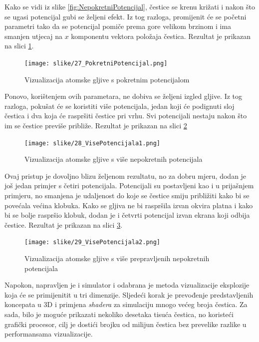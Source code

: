 \documentclass{foi}
\begin{document}
Kako se vidi iz slike \ref{fig:NepokretniPotencijal}, čestice se krenu križati i nakon što se ugasi potencijal gubi se željeni efekt. Iz tog razloga, promijenit će se početni parametri tako da se potencijal pomiče prema gore velikom brzinom i ima smanjen utjecaj na $x$ komponentu vektora položaja čestica. Rezultat je prikazan na slici \ref{fig:PokretniPotencijal}.

\begin{figure}[H]
    \centering
    \texttt{[image: slike/27\_PokretniPotencijal.png]}
    \captionsetup{justification=centering}
    \caption{Vizualizacija atomske gljive s pokretnim potencijalom}
\label{fig:PokretniPotencijal}
\end{figure}

Ponovo, korištenjem ovih parametara, ne dobiva se željeni izgled gljive. Iz tog razloga, pokušat će se koristiti više potencijala, jedan koji će podignuti sloj čestica i dva koja će raspršiti čestice pri vrhu.  Svi potencijali nestaju nakon što im se čestice previše približe. Rezultat je prikazan na slici \ref{fig:VisePotencijala1}

\begin{figure}[H]
    \centering
    \texttt{[image: slike/28\_VisePotencijala1.png]}
    \captionsetup{justification=centering}
    \caption{Vizualizacija atomske gljive s više nepokretnih potencijala}
\label{fig:VisePotencijala1}
\end{figure}

Ovaj pristup je dovoljno blizu željenom rezultatu, no za dobru mjeru, dodan je još jedan primjer s četiri potencijala. Potencijali su postavljeni kao i u prijašnjem primjeru, no smanjena je udaljenost do koje se čestice smiju približiti kako bi se povećala većina klobuka. Kako se gljiva ne bi raspršila izvan okvira platna i kako bi se bolje raspršio klobuk, dodan je i četvrti potencijal izvan ekrana koji odbija čestice. Rezultat je prikazan na slici \ref{fig:VisePotencijala2}.


\begin{figure}[H]
    \centering
    \texttt{[image: slike/29\_VisePotencijala2.png]}
    \captionsetup{justification=centering}
    \caption{Vizualizacija atomske gljive s više prepravljenih nepokretnih potencijala}
\label{fig:VisePotencijala2}
\end{figure}

Napokon, napravljen je i simulator i odabrana je metoda vizualizacije eksplozije koja će se primijenitit u tri dimenzije. Sljedeći korak je prevođenje predstavljenih koncepata u 3D i primjena \textit{shadera} za simulaciju mnogo većeg broja čestica. Za sada, bilo je moguće prikazati nekoliko desetaka tisuća čestica, no koristeći grafički procesor, cilj je dostići brojku od milijun čestica bez prevelike razlike u performansama vizualizacije.
\end{document}
